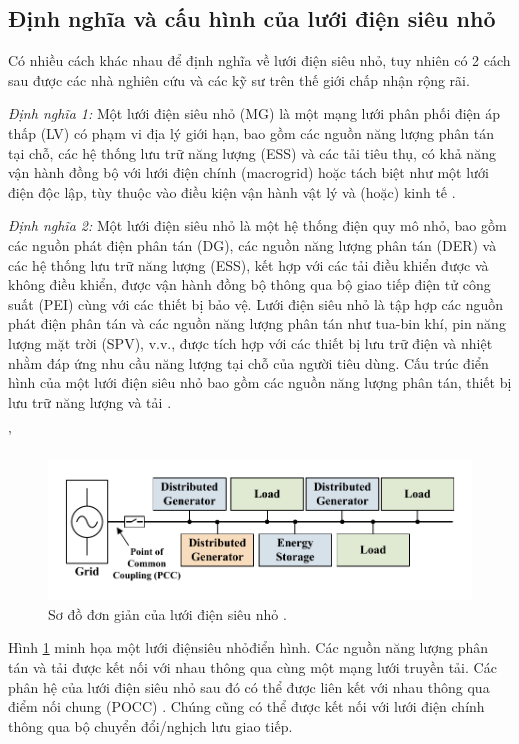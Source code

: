\subsection{Định nghĩa và cấu hình của lưới điện siêu nhỏ}
Có nhiều cách khác nhau để định nghĩa về lưới điện siêu nhỏ, tuy nhiên có 2 cách sau được các nhà nghiên cứu và các kỹ sư trên thế giới chấp nhận rộng rãi. \par
\textit{Định nghĩa 1:} Một lưới điện siêu nhỏ (MG) là một mạng lưới phân phối điện áp thấp (LV) có phạm vi địa lý giới hạn, bao gồm các nguồn năng lượng phân tán tại chỗ, các hệ thống lưu trữ năng lượng (ESS) và các tải tiêu thụ, có khả năng vận hành đồng bộ với lưới điện chính (macrogrid) hoặc tách biệt như một lưới điện độc lập, tùy thuộc vào điều kiện vận hành vật lý và (hoặc) kinh tế \cite{gharehpetian2021microgrids}. \par 
\textit{Định nghĩa 2:} Một lưới điện siêu nhỏ là một hệ thống điện quy mô nhỏ, bao gồm các nguồn phát điện phân tán (DG), các nguồn năng lượng phân tán (DER) và các hệ thống lưu trữ năng lượng (ESS), kết hợp với các tải điều khiển được và không điều khiển, được vận hành đồng bộ thông qua bộ giao tiếp điện tử công suất (PEI) cùng với các thiết bị bảo vệ. Lưới điện siêu nhỏ là tập hợp các nguồn phát điện phân tán và các nguồn năng lượng phân tán như tua-bin khí, pin năng lượng mặt trời (SPV), v.v., được tích hợp với các thiết bị lưu trữ điện và nhiệt nhằm đáp ứng nhu cầu năng lượng tại chỗ của người tiêu dùng. Cấu trúc điển hình của một lưới điện siêu nhỏ bao gồm các nguồn năng lượng phân tán, thiết bị lưu trữ năng lượng và tải \cite{tomar2021control}.\par'
\begin{figure}
    \centering
    \includegraphics[width=\textwidth]{Figures/Content_Pages/Chapter_1/C1_3.pdf}
    \caption{Sơ đồ đơn giản của lưới điện siêu nhỏ \cite{PATRAO2015415}.}
    \label{fig:C1_3}
\end{figure}
Hình \ref{fig:C1_3} minh họa một lưới điệnsiêu nhỏđiển hình. Các nguồn năng lượng phân tán và tải được kết nối với nhau thông qua cùng một mạng lưới truyền tải. Các phân hệ của lưới điện siêu nhỏ sau đó có thể được liên kết với nhau thông qua điểm nối chung (POCC) \cite{tomar2021control}. Chúng cũng có thể được kết nối với lưới điện chính thông qua bộ chuyển đổi/nghịch lưu giao tiếp.\par

